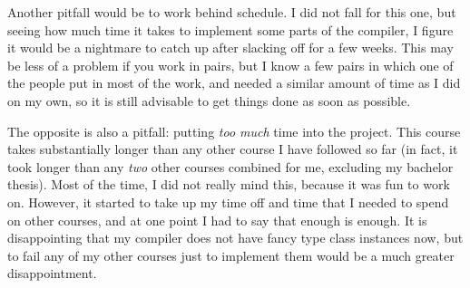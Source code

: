 Another pitfall would be to work behind schedule. I did not fall for this one, but seeing how much time it takes to implement some parts of the compiler, I figure it would be a nightmare to catch up after slacking off for a few weeks. This may be less of a problem if you work in pairs, but I know a few pairs in which one of the people put in most of the work, and needed a similar amount of time as I did on my own, so it is still advisable to get things done as soon as possible.

The opposite is also a pitfall: putting \textit{too much} time into the project. This course takes substantially longer than any other course I have followed so far (in fact, it took longer than any \textit{two} other courses combined for me, excluding my bachelor thesis). Most of the time, I did not really mind this, because it was fun to work on. However, it started to take up my time off and time that I needed to spend on other courses, and at one point I had to say that enough is enough. It is disappointing that my compiler does not have fancy type class instances now, but to fail any of my other courses just to implement them would be a much greater disappointment.



